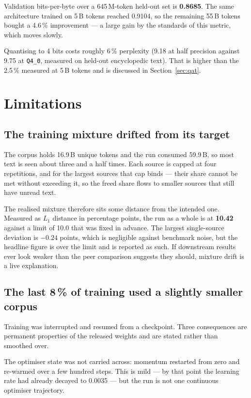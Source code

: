 \documentclass[conference]{IEEEtran}
\begin{document}
Validation bits-per-byte over a 645\,M-token held-out set is \textbf{0.8685}.
The same architecture trained on 5\,B tokens reached 0.9104, so the remaining
55\,B tokens bought a 4.6\,\% improvement --- a large gain by the standards of
this metric, which moves slowly.

Quantising to 4 bits costs roughly 6\,\% perplexity (9.18 at half precision
against 9.75 at \texttt{Q4\_0}, measured on held-out encyclopedic text). That is
higher than the 2.5\,\% measured at 5\,B tokens and is discussed in
Section~\ref{sec:qat}.

\section{Limitations}

\subsection{The training mixture drifted from its target}

The corpus holds 16.9\,B unique tokens and the run consumed 59.9\,B, so most
text is seen about three and a half times. Each source is capped at four
repetitions, and for the largest sources that cap binds --- their share cannot
be met without exceeding it, so the freed share flows to smaller sources that
still have unread text.

The realised mixture therefore sits some distance from the intended one.
Measured as $L_1$ distance in percentage points, the run as a whole is at
\textbf{10.42} against a limit of 10.0 that was fixed in advance. The largest
single-source deviation is $-0.24$ points, which is negligible against benchmark
noise, but the headline figure is over the limit and is reported as such. If
downstream results ever look weaker than the peer comparison suggests they
should, mixture drift is a live explanation.

\subsection{The last 8\,\% of training used a slightly smaller corpus}

Training was interrupted and resumed from a checkpoint. Three consequences are
permanent properties of the released weights and are stated rather than
smoothed over.

The optimiser state was not carried across: momentum restarted from zero and
re-warmed over a few hundred steps. This is mild --- by that point the learning
rate had already decayed to 0.0035 --- but the run is not one continuous
optimiser trajectory.
\end{document}
